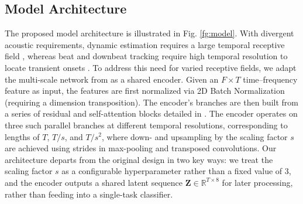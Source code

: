 \documentclass{article}
\begin{document}
\subsection{Model Architecture}
\label{ssec:model}
The proposed model architecture is illustrated in Fig. \ref{fg:model}. With divergent acoustic requirements, dynamic estimation requires a large temporal receptive field \cite{narang2024automatic}, whereas beat and downbeat tracking require high temporal resolution to locate transient onsets \cite{bock2020deconstruct}. To address this need for varied receptive fields, we adapt the multi-scale network from \cite{li2023frame} as a shared encoder. Given an $F{\times}T$ time–frequency feature as input, the features are first normalized via 2D Batch Normalization (requiring a dimension transposition). The encoder's branches are then built from a series of residual and self-attention blocks detailed in \cite{li2023frame}. The encoder operates on three such parallel branches at different temporal resolutions, corresponding to lengths of $T$, $T/s$, and $T/s^{2}$, where down- and upsampling by the scaling factor $s$ are achieved using strides in max-pooling and transposed convolutions. Our architecture departs from the original design \cite{li2023frame} in two key ways: we treat the scaling factor $s$ as a configurable hyperparameter rather than a fixed value of 3, and the encoder outputs a shared latent sequence $\mathbf{Z}\in\mathbb{R}^{T \times 8}$ for later processing, rather than feeding into a single-task classifier.
\end{document}
